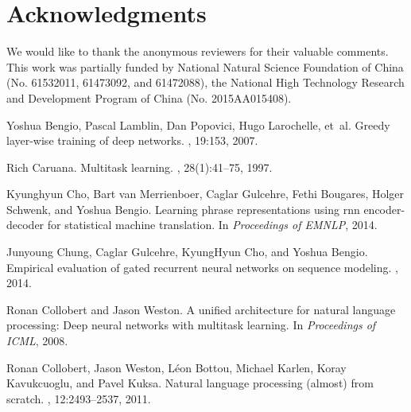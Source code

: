 \documentclass{article}
\begin{document}
\section*{Acknowledgments}
We would like to thank the anonymous reviewers for their valuable comments. This work was partially funded by National Natural Science Foundation of China (No. 61532011, 61473092, and 61472088), the National High Technology Research and Development Program of China (No. 2015AA015408).



\begin{thebibliography}{}

Yoshua Bengio, Pascal Lamblin, Dan Popovici, Hugo Larochelle, et~al.
\newblock Greedy layer-wise training of deep networks.
, 19:153,
  2007.

Rich Caruana.
\newblock Multitask learning.
, 28(1):41--75, 1997.

Kyunghyun Cho, Bart van Merrienboer, Caglar Gulcehre, Fethi Bougares, Holger
  Schwenk, and Yoshua Bengio.
\newblock Learning phrase representations using rnn encoder-decoder for
  statistical machine translation.
\newblock In {\em Proceedings of EMNLP}, 2014.

Junyoung Chung, Caglar Gulcehre, KyungHyun Cho, and Yoshua Bengio.
\newblock Empirical evaluation of gated recurrent neural networks on sequence
  modeling.
, 2014.

Ronan Collobert and Jason Weston.
\newblock A unified architecture for natural language processing: Deep neural
  networks with multitask learning.
\newblock In {\em Proceedings of ICML}, 2008.

Ronan Collobert, Jason Weston, L{\'e}on Bottou, Michael Karlen, Koray
  Kavukcuoglu, and Pavel Kuksa.
\newblock Natural language processing (almost) from scratch.
, 12:2493--2537, 2011.


\end{thebibliography}
\end{document}
